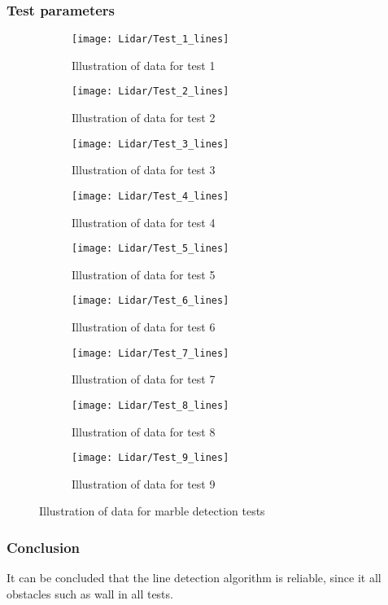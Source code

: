 \documentclass[../Head/Main.tex]{subfiles}
\begin{document}
\subsubsection{Test parameters}
\begin{figure}[H]
  \begin{subfigure}[b]{0.3\textwidth}
  	\centering
    \texttt{[image: Lidar/Test\_1\_lines]}
    \caption{Illustration of data for test 1}
    \label{fig:Linestest1}
  \end{subfigure}
  \hfill
  \begin{subfigure}[b]{0.3\textwidth}
  	\centering
    \texttt{[image: Lidar/Test\_2\_lines]}
    \caption{Illustration of data for test 2}
    \label{fig:Linestest2}
  \end{subfigure}
  \hfill
  \begin{subfigure}[b]{0.3\textwidth}
    \centering
    \texttt{[image: Lidar/Test\_3\_lines]}
    \caption{Illustration of data for test 3}
    \label{fig:Linestest3}
  \end{subfigure}
  \hfill
  \begin{subfigure}[b]{0.3\textwidth}
    \centering
    \texttt{[image: Lidar/Test\_4\_lines]}
    \caption{Illustration of data for test 4}
    \label{fig:Linestest4}
  \end{subfigure}
  \hfill
  \begin{subfigure}[b]{0.3\textwidth}
    \centering
    \texttt{[image: Lidar/Test\_5\_lines]}
    \caption{Illustration of data for test 5}
    \label{fig:Linestest5}
  \end{subfigure}
  \hfill
  \begin{subfigure}[b]{0.3\textwidth}
    \centering
    \texttt{[image: Lidar/Test\_6\_lines]}
    \caption{Illustration of data for test 6}
    \label{fig:Linestest6}
  \end{subfigure}
  \hfill
  \begin{subfigure}[b]{0.3\textwidth}
    \centering
    \texttt{[image: Lidar/Test\_7\_lines]}
    \caption{Illustration of data for test 7}
    \label{fig:Linestest7}
  \end{subfigure}
  \hfill
  \begin{subfigure}[b]{0.3\textwidth}
    \centering
    \texttt{[image: Lidar/Test\_8\_lines]}
    \caption{Illustration of data for test 8}
    \label{fig:Linestest8}
  \end{subfigure}
  \hfill
  \begin{subfigure}[b]{0.3\textwidth}
    \centering
    \texttt{[image: Lidar/Test\_9\_lines]}
    \caption{Illustration of data for test 9}
    \label{fig:Linestest9}
  \end{subfigure}
  \caption{Illustration of data for marble detection tests}
  \label{fig:Linestests}
\end{figure}

\subsubsection{Conclusion}
It can be concluded that the line detection algorithm is reliable, since it all obstacles such as wall in all tests. 
\end{document}
